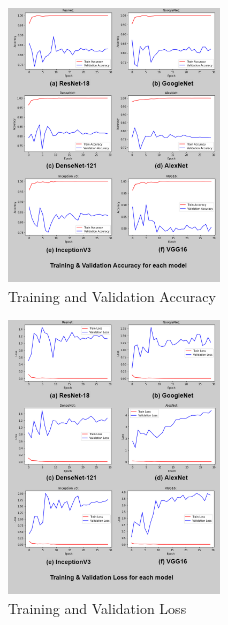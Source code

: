\documentclass{ieeeaccess}
\begin{document}
\begin{figure}[h]
\includegraphics[width=0.5\textwidth, inner]{accuracy.png}
\caption{Training and Validation Accuracy}
\label{fig:accuracy}
\end{figure}

\begin{figure}[h]
\includegraphics[width=0.5\textwidth, inner]{loss.png}
\caption{Training and Validation Loss}
\label{fig:loss}
\end{figure}
\end{document}
